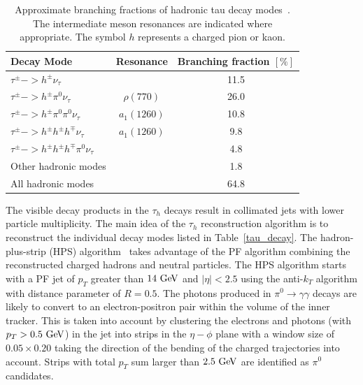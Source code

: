 \begin{table}[htbp]
\begin{center}
\begin{tabular}{lcc} 
\hline 
Decay Mode & Resonance  & Branching fraction $[\%]$   \\ 
\hline 
$\tau^{\pm} -> h^{\pm} \nu_{\tau}$                             &             & 11.5 \\
$\tau^{\pm} -> h^{\pm} \pi^{0} \nu_{\tau}$                    & $\rho(770)$ & 26.0 \\
$\tau^{\pm} -> h^{\pm} \pi^{0}  \pi^{0} \nu_{\tau}$            & $a_1(1260)$            & 10.8 \\
$\tau^{\pm} -> h^{\pm} h^{\pm} h^{\mp} \nu_{\tau} $            & $a_1(1260)$            & 9.8 \\
$\tau^{\pm} -> h^{\pm} h^{\pm} h^{\mp} \pi^{0} \nu_{\tau} $ &                         & 4.8 \\
Other hadronic modes &                         & 1.8 \\ 
\hline 
All hadronic modes &                         & 64.8 \\ 
\hline 
\end{tabular}
\caption{Approximate branching fractions of hadronic tau decay modes~\cite{Agashe:2014kda}. The intermediate meson resonances are indicated where appropriate. The symbol $h$ represents a charged pion or kaon.
}
\label{tab:tau_decay}
\end{center}
\end{table}

The visible decay products in the $\tau_{h}$ decays result in collimated jets with lower particle multiplicity. The main idea of the $\tau_{h}$ reconstruction algorithm is to reconstruct the individual decay modes listed in Table~\ref{tau_decay}. The hadron-plus-strip (HPS) algorithm~\cite{1748-0221-7-01-P01001} takes advantage of the PF algorithm combining the reconstructed charged hadrons and neutral particles.  The HPS algorithm starts with a PF jet of $p_{T}$ greater than $14~\mathrm{Ge\kern -0.1em V}$ and $|\eta|<2.5$ using the anti-$k_{T}$ algorithm with distance parameter of $R=0.5$. The photons produced in $\pi^{0} \rightarrow \gamma\gamma$ decays are likely to convert to an electron-positron pair within the volume of the inner tracker. This is taken into account by clustering the electrons and photons (with $p_{T}>0.5~\mathrm{Ge\kern -0.1em V}$)  in the jet into strips in the $\eta-\phi$ plane with a window size of $0.05\times0.20$ taking the direction of the bending of the charged trajectories into account. Strips with total $p_{T}$ sum larger than $2.5~\mathrm{Ge\kern -0.1em V}$ are identified as $\pi^{0}$ candidates. 

